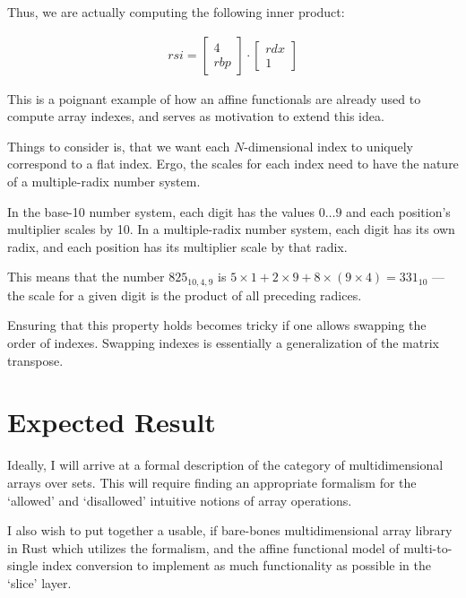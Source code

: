 \documentclass[a4paper,11pt,notitlepage]{article}
\begin{document}
Thus, we are actually computing the following inner product:

\begin{align*}
  rsi = \begin{bmatrix} 4 \\ rbp \end{bmatrix} \cdot \begin{bmatrix} rdx \\ 1 \end{bmatrix}
\end{align*}

This is a poignant example of how an affine functionals are already used to compute array
indexes, and serves as motivation to extend this idea.

Things to consider is, that we want each \(N\)-dimensional index to uniquely correspond to
a flat index. Ergo, the scales for each index need to have the nature of a multiple-radix number
system.

In the base-10 number system, each digit has the values \(0\dots9\) and each position's multiplier
scales by 10. In a multiple-radix number system, each digit has its own radix, and each position has
its multiplier scale by that radix.

This means that the number \(825_{10,4,9}\) is \(5 \times 1 + 2 \times 9 + 8 \times (9 \times 4) = 331_{10}\) ---
the scale for a given digit is the product of all preceding radices.

Ensuring that this property holds becomes tricky if one allows swapping the order of indexes. Swapping
indexes is essentially a generalization of the matrix transpose.

\section{Expected Result}

Ideally, I will arrive at a formal description of the category of multidimensional arrays over sets.
This will require finding an appropriate formalism for the `allowed' and `disallowed' intuitive notions
of array operations.

I also wish to put together a usable, if bare-bones multidimensional array library in Rust which utilizes the
formalism, and the affine functional model of multi-to-single index conversion to implement as much functionality
as possible in the `slice' layer.

\Middle

\Last
\end{document}
